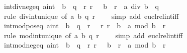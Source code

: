 \begin{isabellebody}
\endisatagproof
{\isafoldproof}%
%
\isadelimproof
\isanewline
%
\endisadelimproof
\isanewline
{}\isamarkupfalse%
\ int{\isacharunderscore}{\kern0pt}div{\isacharunderscore}{\kern0pt}neg{\isacharunderscore}{\kern0pt}eq{\isacharcolon}{\kern0pt}\ {\isachardoublequoteopen}{\isasymlbrakk}{\isacharparenleft}{\kern0pt}a{\isacharcolon}{\kern0pt}{\isacharcolon}{\kern0pt}int{\isacharparenright}{\kern0pt}\ {\isacharequal}{\kern0pt}\ b\ {\isacharasterisk}{\kern0pt}\ q\ {\isacharplus}{\kern0pt}\ r{\isacharsemicolon}{\kern0pt}\ r\ {\isasymle}\ {}{\isacharsemicolon}{\kern0pt}\ b\ {\isacharless}{\kern0pt}\ r{\isasymrbrakk}\ {\isasymLongrightarrow}\ a\ div\ b\ {\isacharequal}{\kern0pt}\ q{\isachardoublequoteclose}\isanewline
%
\isadelimproof
\ \ %
\endisadelimproof
%
\isatagproof
{}\isamarkupfalse%
\ {\isacharparenleft}{\kern0pt}rule\ div{\isacharunderscore}{\kern0pt}int{\isacharunderscore}{\kern0pt}unique\ {\isacharbrackleft}{\kern0pt}of\ a\ b\ q\ r{\isacharbrackright}{\kern0pt}{\isacharcomma}{\kern0pt}\isanewline
\ \ \ \ simp\ add{\isacharcolon}{\kern0pt}\ eucl{\isacharunderscore}{\kern0pt}rel{\isacharunderscore}{\kern0pt}int{\isacharunderscore}{\kern0pt}iff{\isacharparenright}{\kern0pt}%
\endisatagproof
{\isafoldproof}%
%
\isadelimproof
\isanewline
%
\endisadelimproof
\isanewline
{}\isamarkupfalse%
\ int{\isacharunderscore}{\kern0pt}mod{\isacharunderscore}{\kern0pt}pos{\isacharunderscore}{\kern0pt}eq{\isacharcolon}{\kern0pt}\ {\isachardoublequoteopen}{\isasymlbrakk}{\isacharparenleft}{\kern0pt}a{\isacharcolon}{\kern0pt}{\isacharcolon}{\kern0pt}int{\isacharparenright}{\kern0pt}\ {\isacharequal}{\kern0pt}\ b\ {\isacharasterisk}{\kern0pt}\ q\ {\isacharplus}{\kern0pt}\ r{\isacharsemicolon}{\kern0pt}\ {}\ {\isasymle}\ r{\isacharsemicolon}{\kern0pt}\ r\ {\isacharless}{\kern0pt}\ b{\isasymrbrakk}\ {\isasymLongrightarrow}\ a\ mod\ b\ {\isacharequal}{\kern0pt}\ r{\isachardoublequoteclose}\isanewline
%
\isadelimproof
\ \ %
\endisadelimproof
%
\isatagproof
{}\isamarkupfalse%
\ {\isacharparenleft}{\kern0pt}rule\ mod{\isacharunderscore}{\kern0pt}int{\isacharunderscore}{\kern0pt}unique\ {\isacharbrackleft}{\kern0pt}of\ a\ b\ q\ r{\isacharbrackright}{\kern0pt}{\isacharcomma}{\kern0pt}\isanewline
\ \ \ \ simp\ add{\isacharcolon}{\kern0pt}\ eucl{\isacharunderscore}{\kern0pt}rel{\isacharunderscore}{\kern0pt}int{\isacharunderscore}{\kern0pt}iff{\isacharparenright}{\kern0pt}%
\endisatagproof
{\isafoldproof}%
%
\isadelimproof
\isanewline
%
\endisadelimproof
\isanewline
{}\isamarkupfalse%
\ int{\isacharunderscore}{\kern0pt}mod{\isacharunderscore}{\kern0pt}neg{\isacharunderscore}{\kern0pt}eq{\isacharcolon}{\kern0pt}\ {\isachardoublequoteopen}{\isasymlbrakk}{\isacharparenleft}{\kern0pt}a{\isacharcolon}{\kern0pt}{\isacharcolon}{\kern0pt}int{\isacharparenright}{\kern0pt}\ {\isacharequal}{\kern0pt}\ b\ {\isacharasterisk}{\kern0pt}\ q\ {\isacharplus}{\kern0pt}\ r{\isacharsemicolon}{\kern0pt}\ r\ {\isasymle}\ {}{\isacharsemicolon}{\kern0pt}\ b\ {\isacharless}{\kern0pt}\ r{\isasymrbrakk}\ {\isasymLongrightarrow}\ a\ mod\ b\ {\isacharequal}{\kern0pt}\ r{\isachardoublequoteclose}\isanewline

\end{isabellebody}
